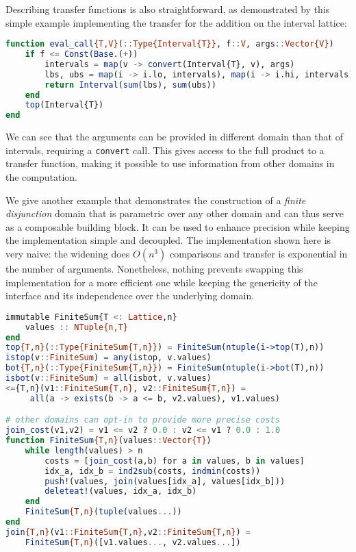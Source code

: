 \documentclass[11pt]{article}
\begin{document}
Describing transfer functions is also straightforward, as demonstrated by this simple example implementing the transfer for the addition on the interval lattice:
\begin{singlespace}
\begin{lstlisting}[language=julia]
function eval_call{T,V}(::Type{Interval{T}}, f::V, args::Vector{V})
    if f <= Const(Base.(+))
        intervals = map(v -> convert(Interval{T}, v), args)
        lbs, ubs = map(i -> i.lo, intervals), map(i -> i.hi, intervals)
        return Interval(sum(lbs), sum(ubs))
    end
    top(Interval{T})
end
\end{lstlisting}
\end{singlespace}
We can see that the arguments can be provided in different domain than that of intervals, requiring a \verb~convert~ call. This gives access to the full product to a transfer function, making it possible to use information from other domains in the computation.


We give another example that demonstrates the construction of a \emph{finite disjunction} domain that is parametric over any other domain and can thus serve as a composable building block. It can be used to enhance precision while keeping the implementation simple and decoupled. The implementation shown here is very naive: the widening does $O(n^3)$ comparisons and transfer is exponential in the number of arguments. Nonetheless, nothing prevents swapping this implementation for a more efficient one while keeping the genericity of the interface and its independence over the underlying domain.

\begin{lstlisting}[language=julia]
immutable FiniteSum{T <: Lattice,n}
    values :: NTuple{n,T}
end
top{T,n}(::Type{FiniteSum{T,n}}) = FiniteSum(ntuple(i->top(T),n))
istop(v::FiniteSum) = any(istop, v.values)
bot{T,n}(::Type{FiniteSum{T,n}}) = FiniteSum(ntuple(i->bot(T),n))
isbot(v::FiniteSum) = all(isbot, v.values)
<={T,n}(v1::FiniteSum{T,n}, v2::FiniteSum{T,n}) =
     all(a -> exists(b -> a <= b, v2.values), v1.values)

# other domains can opt-in to provide more precise costs
join_cost(v1,v2) = v1 <= v2 ? 0.0 : v2 <= v1 ? 0.0 : 1.0
function FiniteSum{T,n}(values::Vector{T})
    while length(values) > n
        costs = [join_cost(a,b) for a in values, b in values]
        idx_a, idx_b = ind2sub(costs, indmin(costs))
        push!(values, join(values[idx_a], values[idx_b]))
        deleteat!(values, idx_a, idx_b)
    end
    FiniteSum{T,n}(tuple(values...))
end
join{T,n}(v1::FiniteSum{T,n},v2::FiniteSum{T,n}) =
    FiniteSum{T,n}([v1.values..., v2.values...])
\end{lstlisting}
\end{document}
